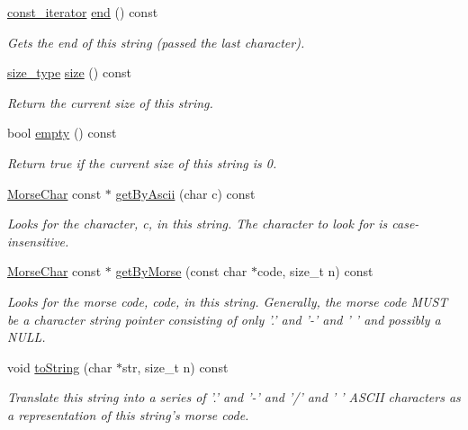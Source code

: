 \begin{DoxyCompactItemize}
\hyperlink{class_morse_string_a8187161e4517b8721bdb562d90200cfd}{const\-\_\-iterator} \hyperlink{class_morse_string_ad3bab83787cf1938feda565894b3a268}{end} () const 
\begin{DoxyCompactList}\small\item\em Gets the end of this string (passed the last character). \end{DoxyCompactList}\item 
\hyperlink{class_morse_string_a87ad452a5f61d3e7468497bdc03a7e6a}{size\-\_\-type} \hyperlink{class_morse_string_ad6bc73513fbab3b758fb85c865c54cd0}{size} () const 
\begin{DoxyCompactList}\small\item\em Return the current size of this string. \end{DoxyCompactList}\item 
bool \hyperlink{class_morse_string_ae32d77ba2cd12479ba18f8bbc328a335}{empty} () const 
\begin{DoxyCompactList}\small\item\em Return true if the current size of this string is 0. \end{DoxyCompactList}\item 
\hyperlink{class_morse_char}{Morse\-Char} const $\ast$ \hyperlink{class_morse_string_a5f1355f99e372c138304b1613ce5c0a8}{get\-By\-Ascii} (char c) const 
\begin{DoxyCompactList}\small\item\em Looks for the character, c, in this string. The character to look for is case-\/insensitive. \end{DoxyCompactList}\item 
\hyperlink{class_morse_char}{Morse\-Char} const $\ast$ \hyperlink{class_morse_string_a9eb4dbebd5f6c28bf7453dabdbd46a1b}{get\-By\-Morse} (const char $\ast$code, size\-\_\-t n) const 
\begin{DoxyCompactList}\small\item\em Looks for the morse code, code, in this string. Generally, the morse code M\-U\-S\-T be a character string pointer consisting of only '.' and '-\/' and ' ' and possibly a N\-U\-L\-L. \end{DoxyCompactList}\item 
void \hyperlink{class_morse_string_a6938ba103471da987c825e24c9ae955f}{to\-String} (char $\ast$str, size\-\_\-t n) const 
\begin{DoxyCompactList}\small\item\em Translate this string into a series of '.' and '-\/' and '/' and ' ' A\-S\-C\-I\-I characters as a representation of this string's morse code. \end{DoxyCompactList}\end{DoxyCompactItemize}
